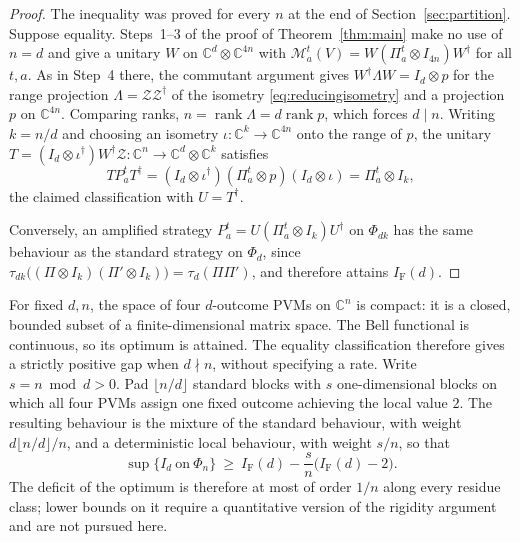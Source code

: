 \documentclass[aps,prl,reprint,superscriptaddress,longbibliography,floatfix,raggedbottom]{revtex4-2}
\newcommand{\C}{\mathbb C}
\DeclareMathOperator{\rank}{rank}
\newcommand{\tr}{\tau}
\newcommand{\IF}{I_{\mathrm F}}
\newcommand{\Zisom}{\mathcal Z}
\newcommand{\RootP}{\mathcal M}
\begin{document}
\begin{proof}
The inequality was proved for every $n$ at the end of
Section~\ref{sec:partition}. Suppose equality. Steps~1--3 of the
proof of Theorem~\ref{thm:main} make no use of $n=d$ and give a
unitary $W$ on $\C^d\otimes\C^{4n}$ with
$\RootP^t_a(V)=W(\Pi^t_a\otimes I_{4n})W^\dagger$ for all $t,a$. As
in Step~4 there, the commutant argument gives
$W^\dagger\Lambda W=I_d\otimes p$ for the range projection
$\Lambda=\Zisom\Zisom^\dagger$ of the isometry
\eqref{eq:reducingisometry} and a projection $p$ on $\C^{4n}$.
Comparing ranks, $n=\rank\Lambda=d\rank p$, which forces $d\mid n$.
Writing $k=n/d$ and choosing an isometry $\iota:\C^k\to\C^{4n}$ onto
the range of $p$, the unitary
$T=(I_d\otimes\iota^\dagger)W^\dagger\Zisom:
\C^n\to\C^d\otimes\C^k$ satisfies
\[
TP^t_aT^\dagger
=(I_d\otimes\iota^\dagger)(\Pi^t_a\otimes p)(I_d\otimes\iota)
=\Pi^t_a\otimes I_k,
\]
the claimed classification with $U=T^\dagger$.

Conversely, an amplified strategy
$P^t_a=U(\Pi^t_a\otimes I_k)U^\dagger$ on $\Phi_{dk}$ has the same
behaviour as the standard strategy on $\Phi_d$, since
$\tr_{dk}\bigl((\Pi\otimes I_k)(\Pi'\otimes I_k)\bigr)
=\tr_d(\Pi\Pi')$, and therefore attains $\IF(d)$.
\end{proof}

For fixed $d,n$, the space of four $d$-outcome PVMs on $\C^n$ is
compact: it is a closed, bounded subset of a finite-dimensional matrix
space. The Bell functional is continuous, so its optimum is attained.
The equality classification therefore gives a strictly positive gap
when $d\nmid n$, without specifying a rate. Write $s=n\bmod d>0$. Pad $\lfloor n/d\rfloor$ standard blocks with $s$
one-dimensional blocks on which all four PVMs assign one fixed
outcome achieving the local value $2$. The resulting behaviour is the
mixture of the standard behaviour, with weight $d\lfloor n/d\rfloor/n$,
and a deterministic local behaviour, with weight $s/n$, so that
\[
\sup\{I_d\ \text{on}\ \Phi_n\}\ \ge\ \IF(d)-\frac sn\bigl(\IF(d)-2\bigr).
\]
The deficit of the optimum is therefore at most of order $1/n$ along
every residue class; lower bounds on it require a quantitative version
of the rigidity argument and are not pursued here.

\makeatletter
\def\UrlBreaks{\do\/}\def\UrlBigBreaks{}%
\def\UrlOrds{\do\*\do\-\do\~\do\'\do\"\do\:\do\.}%
\let\oqp@BibitemOpen\BibitemOpen
\def\BibitemOpen{\oqp@BibitemOpen\rightskip\z@\@plus1fil\relax}
\makeatother

\end{document}
